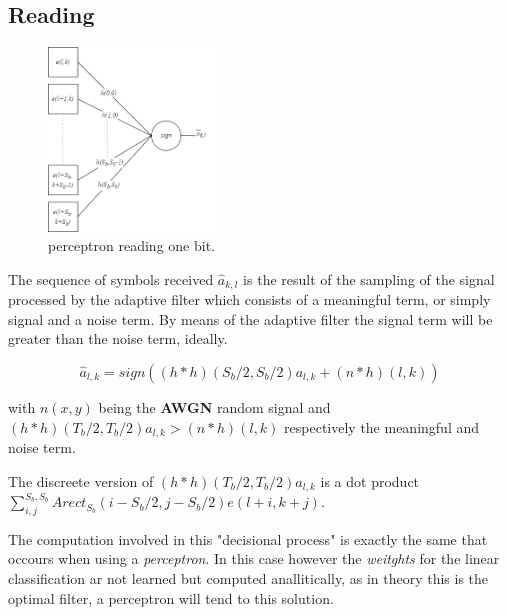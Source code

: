 \documentclass[a4paper]{report}
\begin{document}
\subsection{Reading}

\begin{figure}
    \centering
    \includegraphics[width=0.4\textwidth]{reader_perce.png}
    \caption{perceptron reading one bit.}
\end{figure}

The sequence of symbols received $\hat{a}_{k,l}$ is the result of the sampling of the signal processed by the adaptive filter which consists of a meaningful term, or simply signal and a noise term. By means of the adaptive filter the signal term will be greater than the noise term, ideally.

$$\hat{a}_{l,k} = sign((h * h)(S_b/2,S_b/2)a_{l,k} + (n*h)(l,k))$$

with $n(x,y)$ being the \textbf{AWGN}  random signal and $(h * h)(T_b/2,T_b/2)a_{l,k} > (n*h)(l,k)$ respectively the meaningful and noise term. 

The discreete version of $(h * h)(T_b/2,T_b/2)a_{l,k}$ is a dot product $\sum_{i,j}^{S_b,S_b} Arect_{S_b}(i-S_b/2,j-S_b/2)e(l+i,k+j)$.

The computation involved in this "decisional process" is exactly the same that occours when using a \textit{perceptron}. In this case however the \textit{weitghts} for the linear classification ar not learned but computed anallitically, as in theory this is the optimal filter, a perceptron will tend to this solution.

\newpage
\end{document}
